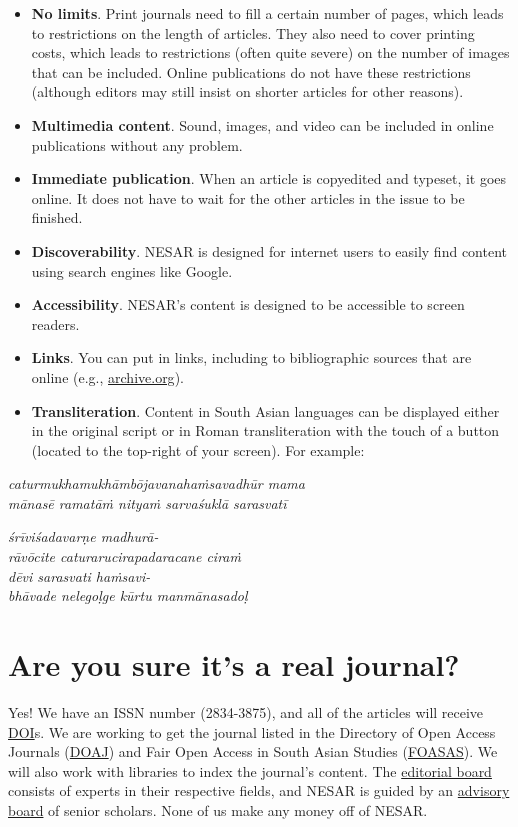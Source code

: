 \begin{itemize}
      \item \textbf{No limits}. Print journals need to fill a certain number of pages, which leads to restrictions on the length of articles. They also need to cover printing costs, which leads to restrictions (often quite severe) on the number of images that can be included. Online publications do not have these restrictions (although editors may still insist on shorter articles for other reasons).
	\item \textbf{Multimedia content}. Sound, images, and video can be included in online publications without any problem.
	\item \textbf{Immediate publication}. When an article is copyedited and typeset, it goes online. It does not have to wait for the other articles in the issue to be finished. 
	\item \textbf{Discoverability}. NESAR is designed for internet users to easily find content using search engines like Google. 
	\item \textbf{Accessibility}. NESAR’s content is designed to be accessible to screen readers.
	\item \textbf{Links}. You can put in links, including to bibliographic sources that are online (e.g., \href{https://archive.org/}{archive.org}).
	\item \textbf{Transliteration}. Content in South Asian languages can be displayed either in the original script or in Roman transliteration with the touch of a button (located to the top-right of your screen). For example:
\end{itemize}
      
\begin{pullquote}
      \emph{caturmukhamukhāmbōjavanahaṁsavadhūr mama}\\
\emph{mānasē ramatāṁ nityaṁ sarvaśuklā sarasvatī}
\end{pullquote}
      
\begin{pullquote}
      \emph{śrīviśadavarṇe madhurā-}\\
\emph{rāvōcite caturarucirapadaracane ciraṁ}\\
\emph{dēvi sarasvati haṁsavi-}\\
\emph{bhāvade nelegoḷge kūrtu manmānasadoḷ}
\end{pullquote}
      
\section{Are you sure it’s a real journal?}\label{ds8ilarly60e}
      Yes! We have an ISSN number (2834-3875), and all of the articles will receive \href{https://www.doi.org/}{DOI}s. We are working to get the journal listed in the Directory of Open Access Journals (\href{https://doaj.org/}{DOAJ}) and Fair Open Access in South Asian Studies (\href{https://foasas.org/}{FOASAS}). We will also work with libraries to index the journal’s content. The \hyperref[lq0qsyc9zvaw]{editorial board} consists of experts in their respective fields, and NESAR is guided by an \hyperref[lq0qsyc9zvaw]{advisory board} of senior scholars. None of us make any money off of NESAR.

